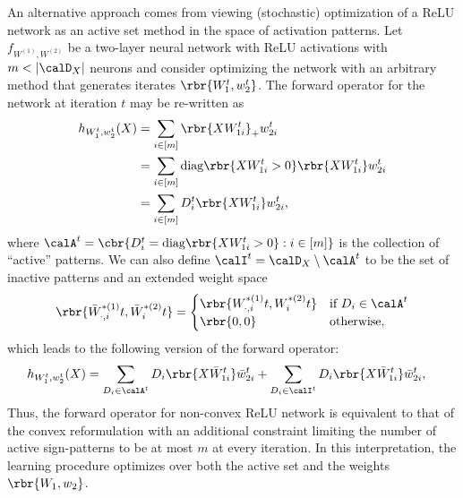 An alternative approach comes from viewing (stochastic) optimization of a ReLU network as an active set method in the space of activation patterns.
Let \( f_{W^{(1)}, W^{(2)}} \) be a two-layer neural network with ReLU activations with \( m < |\calD_X| \) neurons and consider optimizing the network with an arbitrary method that generates iterates \( \rbr{W_1^t, w_2^t} \).
The forward operator for the network at iteration \( t \) may be re-written as
\begin{align*}
	h_{W^t_1, w^t_2}(X)
	 & = \sum_{i \in [m]} \rbr{X W^t_{1i}}_+ w^t_{2i}                               \\
	 & = \sum_{i \in [m]} \text{diag}\rbr{X W^t_{1i} > 0} \rbr{X W^t_{1i}} w^t_{2i} \\
	 & = \sum_{i \in [m]} D_i^t \rbr{X W^t_{1i}} w^t_{2i},
\end{align*}
where \( \calA^t = \cbr{D^t_i = \text{diag}\rbr{X W^t_{1i} > 0} : i \in [m]} \) is the collection of ``active'' patterns.
We can also define \( \calI^t = \calD_X \setminus \calA^t \) to be the set of inactive patterns and an extended weight space
\begin{align*}
	\rbr{\bar W^{*(1)}_{\cdot, i}t, \bar W^{*(2)}_{i}t} =
	\begin{cases}
		\rbr{W^{*(1)}_{\cdot, i}t, W^{*(2)}_{i}t} & \mbox{if \( D_i \in \calA^t \)} \\
		\rbr{0, 0}               & \mbox{otherwise},
	\end{cases}
\end{align*}
which leads to the following version of the forward operator:
\begin{align*}
	h_{W^t_1, w^t_2}(X)
	 & = \sum_{D_i \in \calA^t} D_i \rbr{X \bar W^t_{1i}} \bar w^t_{2i} + \sum_{D_i \in \calI^t} D_i \rbr{X \bar W^t_{1i}} \bar w^t_{2i},
\end{align*}
Thus, the forward operator for non-convex ReLU network is equivalent to that of the convex reformulation with an additional constraint limiting the number of active sign-patterns to be at most \( m \) at every iteration.
In this interpretation, the learning procedure optimizes over both the active set and the weights \( \rbr{W_{1}, w_{2}} \).

